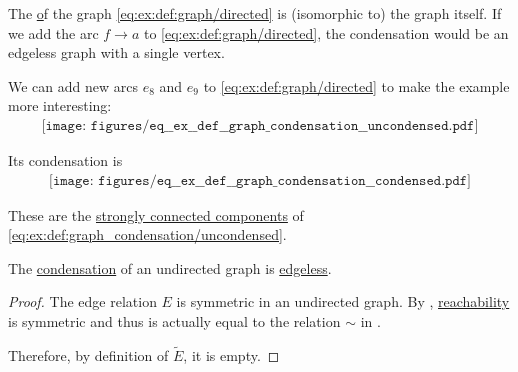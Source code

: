 \begin{example}\label{ex:def:graph_condensation}
  The \hyperref[def:graph_condensation] of the graph \eqref{eq:ex:def:graph/directed} is (isomorphic to) the graph itself. If we add the arc \( f \to a \) to \eqref{eq:ex:def:graph/directed}, the condensation would be an edgeless graph with a single vertex.

  We can add new arcs \( e_8 \) and \( e_9 \) to \eqref{eq:ex:def:graph/directed} to make the example more interesting:
  \begin{equation}\label{eq:ex:def:graph_condensation/uncondensed}
    \begin{aligned}
      \texttt{[image: figures/eq\_\_ex\_\_def\_\_graph\_condensation\_\_uncondensed.pdf]}
    \end{aligned}
  \end{equation}

  Its condensation is
  \begin{equation}\label{eq:ex:def:graph_condensation/condensed}
    \begin{aligned}
      \texttt{[image: figures/eq\_\_ex\_\_def\_\_graph\_condensation\_\_condensed.pdf]}
    \end{aligned}
  \end{equation}

  These are the \hyperref[def:graph_connectedness/strong]{strongly connected components} of \eqref{eq:ex:def:graph_condensation/uncondensed}.
\end{example}

\begin{proposition}\label{thm:undirected_graph_condensation}
  The \hyperref[def:graph_condensation]{condensation} of an undirected graph is \hyperref[def:graph/trivial]{edgeless}.
\end{proposition}
\begin{proof}
  The edge relation \( E \) is symmetric in an undirected graph. By , \hyperref[def:graph_directed_path/reachability]{reachability} is symmetric and thus is actually equal to the relation \( {\sim} \) in .

  Therefore, by definition of \( \widetilde{E} \), it is empty.
\end{proof}

